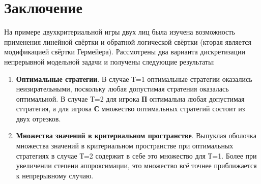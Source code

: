\section{Заключение}

На примере двухкритериальной игры двух лиц была изучена возможность 
применения линейной свёртки и обратной логической свёртки (кторая 
является модификацией свёртки Гермейера). Рассмотрены два варианта 
дискретизации непрерывной модельной задачи и получены следующие результаты:
\begin{enumerate}
	\item \textbf{Оптимальные стратегии}. В случае Т=1 оптимальные
	стратегии оказались неизирательными, поскольку любая
	допустимая стратения оказалась оптимальной. В случае Т=2
	для игрока \textbf{П} оптимальна любая допустимая сттратегия, а
	для игрока \textbf{С} множество оптимальных стратегий состоит из
	двух отрезков.  
 
	\item \textbf{Множества значений в критериальном пространстве}. 
	Выпуклая оболочка множества значений в критериальном пространстве 
	при оптимальных стратегиях в случае Т=2 содержит в себе это
	множество для Т=1. Более при увеличении степени аппроксимации,
	это множество всё точнее приближается к непрерывному случаю.
	
\end{enumerate}

